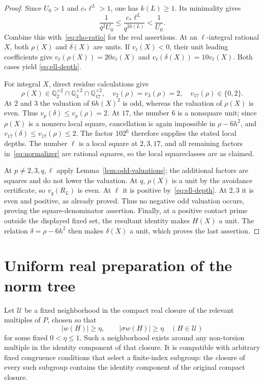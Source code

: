 \documentclass[11pt]{article}
\theoremstyle{remark}\newtheorem{remark}[theorem]{Remark}
\newcommand{\Q}{\mathbb Q}\newcommand{\Z}{\mathbb Z}
\begin{document}
\begin{proof}
Since $U_0>1$ and $c_*\ell^L>1$, one has $k(L)\ge1$.
Its minimality gives
\[
 \frac1{q^2U_0}\le\frac{c_*\ell^L}{q^{2k(L)}}<\frac1{U_0}.
\]
Combine this with~\eqref{eq:rho-ratio} for the real assertions.
At an $\ell$-integral rational $X$, both $\rho(X)$ and $\delta(X)$
are units.  If $v_\ell(X)<0$, their unit leading coefficients give
$v_\ell(\rho(X))=20v_\ell(X)$ and
$v_\ell(\delta(X))=10v_\ell(X)$.  Both cases yield
\eqref{eq:ell-depth}.

For integral $X$, direct residue calculations give
\[
 \rho(X)\in\Q_2^{\times2}\cap\Q_3^{\times2}\cap\Q_{17}^{\times2},
 \quad v_2(\rho)=v_3(\rho)=2,\quad v_{17}(\rho)\in\{0,2\}.
\]
At $2$ and $3$ the valuation of $6h(X)^2$ is odd, whereas the
valuation of $\rho(X)$ is even.  Thus $v_p(\delta)\le v_p(\rho)=2$.
At $17$, the number $6$ is a nonsquare unit; since $\rho(X)$ is a
nonzero local square, cancellation is again impossible in
$\rho-6h^2$, and $v_{17}(\delta)\le v_{17}(\rho)\le2$.
The factor $102^6$ therefore supplies the stated local depths.
The number $\ell$ is a local square at $2,3,17$, and all remaining
factors in~\eqref{eq:normalizer} are rational squares, so the local
squareclasses are as claimed.

At $p\ne2,3,q,\ell$ apply Lemma~\ref{lem:odd-valuations}; the
additional factors are squares and do not lower the valuation.
At $q$, $\rho(X)$ is a unit by the avoidance certificate, so
$v_q(R_L)$ is even.  At $\ell$ it is positive by~\eqref{eq:ell-depth}.
At $2,3$ it is even and positive, as already proved.  Thus no
negative odd valuation occurs, proving the square-denominator
assertion.  Finally, at a positive contact prime outside the
displayed fixed set, the resultant identity makes $H(X)$ a unit.
The relation $\delta=\rho-6h^2$ then makes $\delta(X)$ a unit,
which proves the last assertion.
\end{proof}

\section{Uniform real preparation of the norm tree}

Let $\mathcal U$ be a fixed neighborhood in the compact real closure
of the relevant multiples of $P$, chosen so that
\begin{equation}\label{eq:H-open}
 |w(H)|\ge\eta,\qquad |\sigma w(H)|\ge\eta
 \quad(H\in\mathcal U)
\end{equation}
for some fixed $0<\eta\le1$.
Such a neighborhood exists around any non-torsion multiple in the
identity component of that closure.  It is compatible with arbitrary
fixed congruence conditions that select a finite-index subgroup:
the closure of every such subgroup contains the identity component
of the original compact closure.
\end{document}
